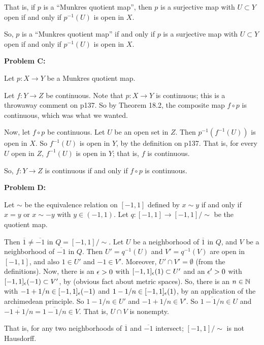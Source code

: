 \documentclass[a4paper,12pt]{article}
\begin{document}
That is, if $p$ is a ``Munkres quotient map'', then $p$ is a surjective map with $U \subset Y$ open if and only if $p^{-1}(U)$ is open in $X$.

So, $p$ is a ``Munkres quotient map'' if and only if $p$ is a surjective map with $U \subset Y$ open if and only if $p^{-1}(U)$ is open in $X$.

\shunt

{\bf Problem C:}

Let $p: X \to Y$ be a Munkres quotient map.

Let $f: Y \to Z$ be continuous. Note that $p: X \to Y$ is continuous; this is a throwaway comment on p137. So by Theorem 18.2, the composite map $f \circ p$ is continuous, which was what we wanted.

Now, let $f \circ p$ be continuous. Let $U$ be an open set in $Z$. Then $p^{-1}(f^{-1}(U))$ is open in $X$. So $f^{-1}(U)$ is open in $Y$, by the definition on p137. That is, for every $U$ open in $Z$, $f^{-1}(U)$ is open in $Y$; that is, $f$ is continuous.

So, $f: Y \to Z$ is continuous if and only if $f \circ p$ is continuous.

\shunt

{\bf Problem D:}

Let $\sim$ be the equivalence relation on $[-1,1]$ defined by $x \sim y$ if and only if $x = y$ or $x \sim -y$ with $y \in (-1,1)$. Let $q: [-1,1] \to [-1,1]/\sim$ be the quotient map.

Then $\overline{1} \neq \overline{-1}$ in $Q=[-1,1]/\sim$. Let $U$ be a neighborhood of $\overline{1}$ in $Q$, and $V$ be a neighborhood of $\overline{-1}$ in $Q$. Then $U'=q^{-1}(U)$ and $V'=q^{-1}(V)$ are open in $[-1,1]$, and also $1 \in U'$ and $-1 \in V'$. Moreover, $U' \cap V' = \emptyset$ (from the definitions). Now, there is an $\epsilon>0$ with $ [-1,1]_\epsilon(1)\subset U'$ and an $\epsilon'>0$ with $[-1,1]_\epsilon(-1) \subset V'$, by (obvious fact about metric spaces). So, there is an $n \in \mathbb{N}$ with $-1+1/n \in  [-1,1]_\epsilon(-1)$ and $1-1/n \in [-1,1]_\epsilon(1)$, by an application of the archimedean principle. So $1-1/n \in U'$ and $-1+1/n \in V'$. So $\overline{1-1/n} \in U$ and $\overline{-1+1/n} = \overline{1-1/n} \in V$. That is, $U \cap V$ is nonempty.

That is, for any two neighborhoods of $\overline{1}$ and $\overline{-1}$ intersect; $[-1,1]/\sim$ is not Hausdorff.

\end{document}

